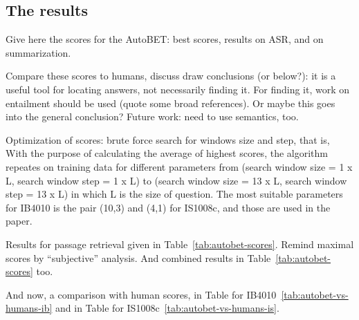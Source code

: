 \documentclass[11pt]{article}
\begin{document}
\subsection{The results}

Give here the scores for the AutoBET: best scores, results on ASR, and on summarization.

Compare these scores to humans, discuss draw conclusions (or below?): it is a useful tool for locating answers, not necessarily finding it.  For finding it, work on entailment should be used (quote some broad references).  Or maybe this goes into the general conclusion?  Future work: need to use semantics, too.

Optimization of scores: brute force search for windows size and step, that is, 
With the purpose of calculating the average of highest scores, the algorithm repeates on
training data for different parameters from (search window size = 1 x L, search window step
= 1 x L) to (search window size = 13 x L, search window step = 13 x L) in which L is the
size of question.  The most suitable parameters for IB4010 is the pair (10,3)
and (4,1) for IS1008c, and those are used in the paper.


Results for passage retrieval given in Table~\ref{tab:autobet-scores}.  Remind maximal scores by ``subjective'' analysis.
And combined results in Table~\ref{tab:autobet-scores} too.

And now, a comparison with human scores, in Table for IB4010~\ref{tab:autobet-vs-humans-ib} and in Table for IS1008c~\ref{tab:autobet-vs-humans-is}.
\end{document}
